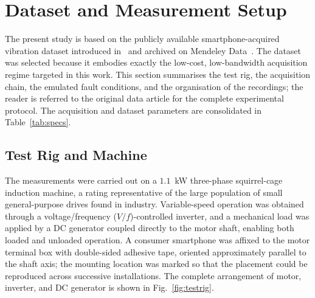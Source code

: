 
\section{Dataset and Measurement Setup}
\label{sec:dataset}

The present study is based on the publicly available smartphone-acquired
vibration dataset introduced in~\cite{ertargin2026smartphone} and archived on
Mendeley Data~\cite{ertargin2026dataset}. The dataset was selected because it
embodies exactly the low-cost, low-bandwidth acquisition regime targeted in this
work. This section summarises the test rig, the acquisition chain, the emulated
fault conditions, and the organisation of the recordings; the reader is referred
to the original data article for the complete experimental protocol. The
acquisition and dataset parameters are consolidated in
Table~\ref{tab:specs}.

\subsection{Test Rig and Machine}
The measurements were carried out on a $1.1$~kW three-phase squirrel-cage
induction machine, a rating representative of the large population of small
general-purpose drives found in industry. Variable-speed operation was obtained
through a voltage/frequency ($V/f$)-controlled inverter, and a mechanical load
was applied by a DC generator coupled directly to the motor shaft, enabling both
loaded and unloaded operation. A consumer smartphone was affixed to the motor
terminal box with double-sided adhesive tape, oriented approximately parallel to
the shaft axis; the mounting location was marked so that the placement could be
reproduced across successive installations. The complete arrangement of motor,
inverter, and DC generator is shown in Fig.~\ref{fig:testrig}.

